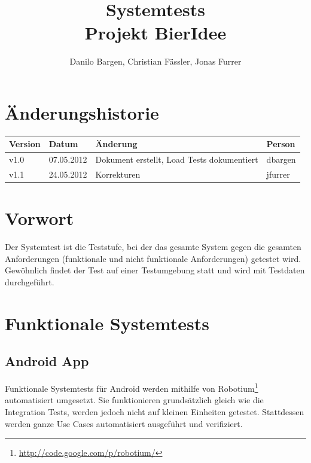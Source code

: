 \documentclass[10pt,a4paper]{scrartcl}
\author{Danilo Bargen, Christian Fässler, Jonas Furrer}
\title{Systemtests\\Projekt BierIdee}
\begin{document}
\begin{titlepage}
	\maketitle
	\vspace{120mm}
	\thispagestyle{empty} %
\end{titlepage}

\tableofcontents
\newpage

\section*{Änderungshistorie}
\begin{tabular}{p{}p{}p{}p{}}
\toprule
\textbf{Version} & \textbf{Datum} & \textbf{Änderung} & \textbf{Person} \\  
\midrule
v1.0 & 07.05.2012 & Dokument erstellt, Load Tests dokumentiert & dbargen \\  
\hline 
v1.1 & 24.05.2012 & Korrekturen & jfurrer \\
\hline 
\bottomrule
\end{tabular} 
\newpage

\section{Vorwort}

Der Systemtest ist die Teststufe, bei der das gesamte System gegen die gesamten Anforderungen
(funktionale und nicht funktionale Anforderungen) getestet wird. Gewöhnlich findet der Test auf
einer Testumgebung statt und wird mit Testdaten durchgeführt.


\section{Funktionale Systemtests}

\subsection{Android App}

Funktionale Systemtests für Android werden mithilfe von
Robotium\footnote{\url{http://code.google.com/p/robotium/}} automatisiert umgesetzt. Sie
funktionieren grundsätzlich gleich wie die Integration Tests, werden jedoch nicht auf kleinen
Einheiten getestet. Stattdessen werden ganze Use Cases automatisiert ausgeführt und verifiziert.
\end{document}
